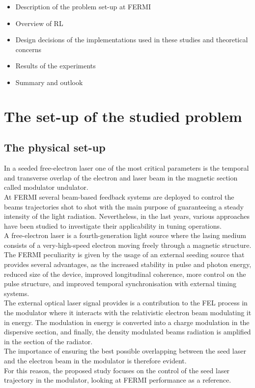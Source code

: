 \documentclass[
reprint,
amsmath,amssymb,amsfonts,clevref,
aps,
prstab,
]{revtex4-2}
\begin{document}
	\begin{itemize}
		\item Description of the problem set-up at FERMI
		\item Overview of RL
		\item Design decisions of the implementations used in these studies and theoretical concerns
		\item Results of the experiments 
		\item Summary and outlook
	\end{itemize}
	
	
	\section{The set-up of the studied problem}
	\subsection{The physical set-up}
	In a seeded free-electron laser one of the most critical parameters is the temporal and transverse overlap of the electron and laser beam in the magnetic section called modulator undulator.\\
	At FERMI several beam-based feedback systems are deployed to control the beams trajectories shot to shot with the main purpose of guaranteeing a steady intensity of the light radiation. Nevertheless, in the last years, various approaches have been studied to investigate their applicability in tuning operations. \\
	A free-electron laser is a fourth-generation light source where the lasing medium consists of a very-high-speed electron moving freely through a magnetic structure. The FERMI peculiarity is given by the usage of an external seeding source that provides several advantages, as the increased stability in pulse and photon energy, reduced size of the device, improved longitudinal coherence, more control on the pulse structure, and improved temporal synchronisation with external timing systems.\\
	The external optical laser signal provides is a contribution to the FEL process in the modulator where it interacts with the relativistic electron beam modulating it in energy. The modulation in energy is converted into a charge modulation in the dispersive section, and finally, the density modulated beams radiation is amplified in the section of the radiator.\\
	 The importance of ensuring the best possible overlapping between the seed laser and the electron beam in the modulator is therefore evident.\\
	For this reason, the proposed study focuses on the control of the seed laser trajectory in the modulator, looking at FERMI performance as a reference.
\end{document}
